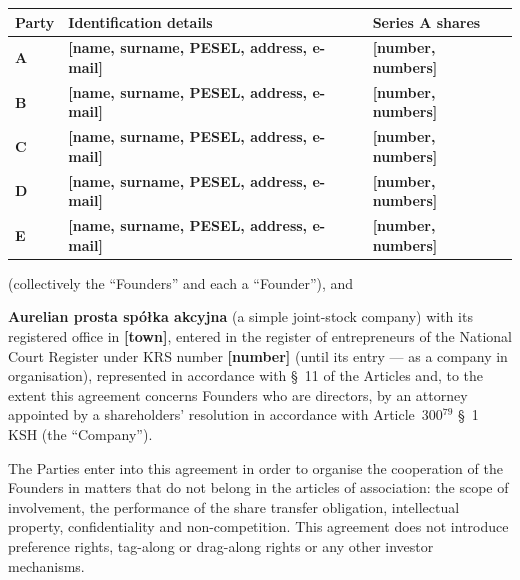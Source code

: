 \documentclass[12pt,a4paper]{report}
\newcommand{\field}[1]{\textbf{[#1]}}
\newcommand{\CompanyFull}{Aurelian prosta spółka akcyjna}
\newcommand{\USen}[1]{\S~#1 of the Articles}
\begin{document}
\begin{center}
\begin{tabularx}{\textwidth}{>{\bfseries}p{1.6cm} >{\raggedright\arraybackslash}X >{\raggedright\arraybackslash}p{3.2cm}}
\toprule
Party & Identification details & Series A shares \\
\midrule
A & \field{name, surname, PESEL, address, e-mail} & \field{number, numbers} \\
B & \field{name, surname, PESEL, address, e-mail} & \field{number, numbers} \\
C & \field{name, surname, PESEL, address, e-mail} & \field{number, numbers} \\
D & \field{name, surname, PESEL, address, e-mail} & \field{number, numbers} \\
E & \field{name, surname, PESEL, address, e-mail} & \field{number, numbers} \\
\bottomrule
\end{tabularx}
\end{center}

(collectively the ``Founders'' and each a ``Founder''), and

\textbf{\CompanyFull} (a simple joint-stock company) with its registered office in \field{town}, entered in the register of entrepreneurs of the National Court Register under KRS number \field{number} (until its entry --- as a company in organisation), represented in accordance with \USen{11} and, to the extent this agreement concerns Founders who are directors, by an attorney appointed by a shareholders' resolution in accordance with Article~300$^{79}$ \S~1 KSH (the ``Company'').

The Parties enter into this agreement in order to organise the cooperation of the Founders in matters that do not belong in the articles of association: the scope of involvement, the performance of the share transfer obligation, intellectual property, confidentiality and non-competition. This agreement does not introduce preference rights, tag-along or drag-along rights or any other investor mechanisms.
\end{document}
